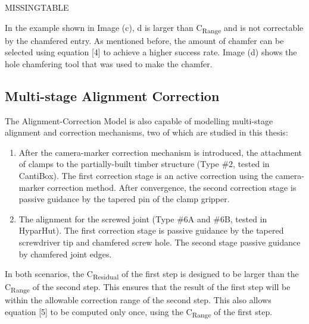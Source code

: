 MISSINGTABLE


In the example shown in Image (c), d is larger than C\textsubscript{Range} and is not correctable by the chamfered entry. As mentioned before,\textit{ }the amount of chamfer can be selected using equation [4] to achieve a higher success rate. Image (d) shows the hole chamfering tool that was used to make the chamfer.



\subsection{Multi-stage Alignment Correction}

The Alignment-Correction Model is also capable of modelling multi-stage alignment and correction mechanisms, two of which are studied in this thesis:

\begin{enumerate}
	\item After the camera-marker correction mechanism is introduced, the attachment of clamps to the partially-built timber structure (Type $\#$2, tested in CantiBox). The first correction stage is an active correction using the camera-marker correction method. After convergence, the second correction stage is passive guidance by the tapered pin of the clamp gripper.

	\item The alignment for the screwed joint (Type $\#$6A and $\#$6B, tested in HyparHut). The first correction stage is passive guidance by the tapered screwdriver tip and chamfered screw hole. The second stage passive guidance by chamfered joint edges. 

\end{enumerate}
In both scenarios, the C\textsubscript{Residual} of the first step is designed to be larger than the C\textsubscript{Range} of the second step. This ensures that the result of the first step will be within the allowable correction range of the second step. This also allows equation [5] to be computed only once, using the C\textsubscript{Range }of the first step.

